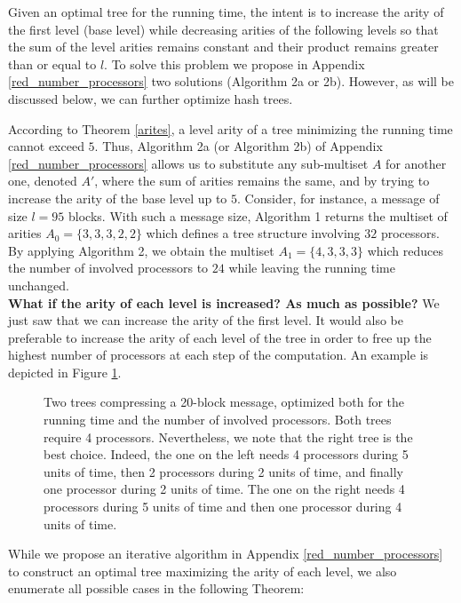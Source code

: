 \documentclass{llncs}
\begin{document}
Given an optimal tree for the running time, the intent is to increase the arity of the first level (base level) while decreasing arities 
of the following levels so that the sum of the level arities remains constant and their product remains greater than or equal to $l$.
To solve this problem we propose in Appendix \ref{red_number_processors} two solutions (Algorithm 2a or 2b). However, as will be discussed below,
we can further optimize hash trees.

According to Theorem \ref{arites}, a level arity of a tree minimizing the running time cannot exceed $5$. 
Thus, Algorithm 2a (or Algorithm 2b) of Appendix \ref{red_number_processors} allows us to substitute any sub-multiset $A$ for 
another one, denoted $A'$, where the sum of arities remains the same, 
and by trying to increase the arity of the base level up to $5$.
Consider, for instance, a message of size $l=95$ blocks. With such a message size, Algorithm 1 returns the multiset of arities $A_0=\{3,3,3,2,2\}$
which defines a tree structure involving $32$ processors.
By applying Algorithm 2, we obtain the multiset $A_1=\{4,3,3,3\}$ which reduces the number of involved processors to $24$ 
while leaving the running time unchanged.
~\\

\noindent
\textbf{What if the arity of each level is increased? As much as possible?}
We just saw 
that we can increase the arity of the first level.
It would also be preferable to increase the arity of each level of the tree in order to free up the highest number of processors 
at each step of the computation. An example is depicted in Figure \ref{Gain_proc}.
\begin{figure}[h]
  \centering
 \caption{Two trees compressing a 20-block message, optimized both for the running time and the number of involved processors. 
 Both trees require 4 processors.
 Nevertheless, we note that the right tree is the best choice. Indeed, the one on the left needs 4 processors during 5 units of time,
 then 2 processors during 2 units of time, and finally one processor during 2 units of time. The one on the right needs 4 processors during 5 units of time and then one processor during 4 units 
 of time.}
\label{Gain_proc}
\end{figure}

While we propose an iterative algorithm in Appendix \ref{red_number_processors} to construct an optimal tree maximizing the arity of each level, we also 
enumerate all possible cases in the following Theorem:
\end{document}
